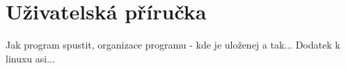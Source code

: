 \chapter{Uživatelská příručka}
\label{chap:userGuide}
Jak program spustit, organizace programu - kde je uloženej a tak...
Dodatek k linuxu asi...